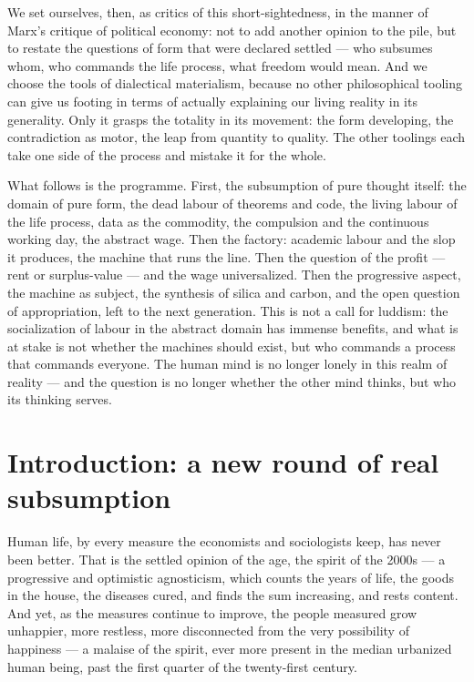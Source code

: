 \documentclass[11pt]{article}
\begin{document}
We set ourselves, then, as critics of this short-sightedness, in the
manner of Marx's critique of political economy: not to add another
opinion to the pile, but to restate the questions of form that were
declared settled --- who subsumes whom, who commands the life process,
what freedom would mean. And we choose the tools of dialectical
materialism, because no other philosophical tooling can give us footing
in terms of actually explaining our living reality in its generality.
Only it grasps the totality in its movement: the form developing, the
contradiction as motor, the leap from quantity to quality. The other
toolings each take one side of the process and mistake it for the
whole.

What follows is the programme. First, the subsumption of pure thought
itself: the domain of pure form, the dead labour of theorems and code,
the living labour of the life process, data as the commodity, the
compulsion and the continuous working day, the abstract wage. Then the
factory: academic labour and the slop it produces, the machine that
runs the line. Then the question of the profit --- rent or
surplus-value --- and the wage universalized. Then the progressive
aspect, the machine as subject, the synthesis of silica and carbon,
and the open question of appropriation, left to the next generation.
This is not a call for luddism: the socialization of labour in the
abstract domain has immense benefits, and what is at stake is not
whether the machines should exist, but who commands a process that
commands everyone. The human mind is no longer lonely in this realm of
reality --- and the question is no longer whether the other mind
thinks, but who its thinking serves.

\section{Introduction: a new round of real subsumption}

Human life, by every measure the economists and sociologists keep, has
never been better. That is the settled opinion of the age, the spirit
of the 2000s --- a progressive and optimistic agnosticism, which counts
the years of life, the goods in the house, the diseases cured, and
finds the sum increasing, and rests content. And yet, as the measures
continue to improve, the people measured grow unhappier, more restless,
more disconnected from the very possibility of happiness --- a malaise
of the spirit, ever more present in the median urbanized human being,
past the first quarter of the twenty-first century.
\end{document}
